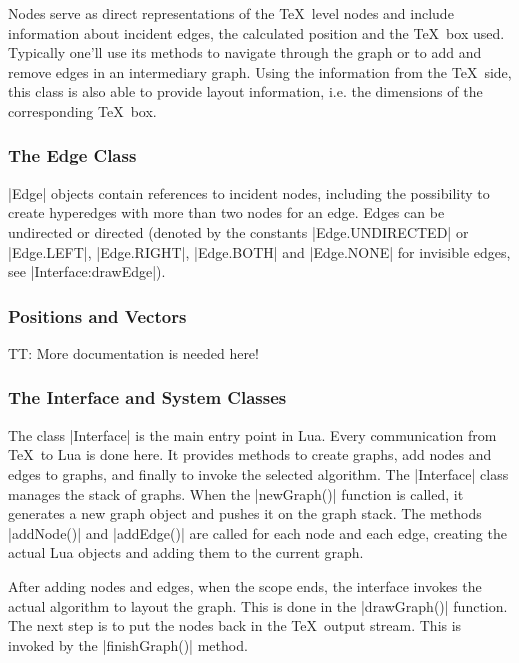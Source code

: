 Nodes serve as direct representations of the \TeX\ level nodes and
include information about incident edges, the calculated position and
the \TeX\ box used.  Typically one'll use its methods to navigate
through the graph or to add and remove edges in an intermediary graph.
Using the information from the \TeX\ side, this class is also able to
provide layout information, i.e. the dimensions of the corresponding
\TeX\ box.

%


\subsubsection{The Edge Class}

|Edge| objects contain references to incident nodes, including the
possibility to create hyperedges with more than two nodes for an edge.
Edges can be undirected or directed (denoted by the constants
|Edge.UNDIRECTED| or |Edge.LEFT|, |Edge.RIGHT|, |Edge.BOTH| and
|Edge.NONE| for invisible edges, see |Interface:drawEdge|). 

%


\subsubsection{Positions and Vectors}

TT: More documentation is needed here!

%
%


\subsubsection{The Interface and System Classes}

The class |Interface| is the main entry point in Lua. Every
communication from \TeX\ to Lua is done here. It provides methods to
create graphs, add nodes and edges to graphs, and finally to invoke the
selected algorithm. The |Interface| class manages the stack of
graphs. When the |newGraph()| function is called, it generates a new graph
object and pushes it on the graph stack. The methods |addNode()| and
|addEdge()| are called for each node and each edge, creating the
actual Lua objects and adding them to the current graph. 

After adding nodes and edges, when the scope ends, the interface
invokes the actual algorithm to layout the graph. This is done in the
|drawGraph()| function. The next step is to put the nodes back in the
\TeX\ output stream. This is invoked by the |finishGraph()| method. 

